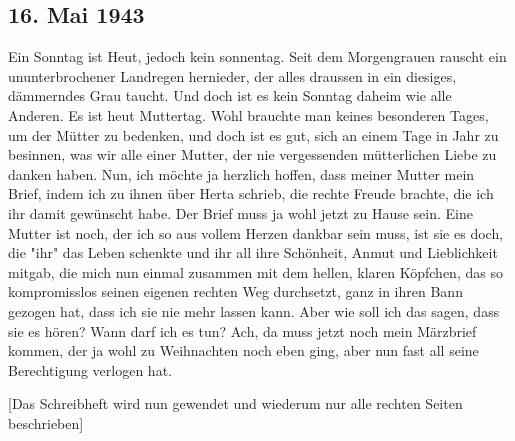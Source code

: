\subsection{16. Mai 1943}

Ein Sonntag ist Heut, jedoch kein sonnentag.
Seit dem Morgengrauen rauscht ein ununterbrochener Landregen hernieder, der alles draussen in ein diesiges, d\"{a}mmerndes Grau taucht.
Und doch ist es kein Sonntag daheim wie alle Anderen.
Es ist heut Muttertag.
Wohl brauchte man keines besonderen Tages, um der M\"{u}tter zu bedenken, und doch ist es gut, sich an einem Tage in Jahr zu besinnen, was wir alle einer Mutter, der nie vergessenden m\"{u}tterlichen Liebe zu danken haben.
Nun, ich m\"{o}chte ja herzlich hoffen, dass meiner Mutter mein Brief, indem ich zu ihnen \"{u}ber Herta schrieb, die rechte Freude brachte, die ich ihr damit gew\"{u}nscht habe.
Der Brief muss ja wohl jetzt zu Hause sein.
Eine Mutter ist noch, der ich so aus vollem Herzen dankbar sein muss, ist sie es doch, die "ihr" das Leben schenkte und ihr all ihre Sch\"{o}nheit, Anmut und Lieblichkeit mitgab, die mich nun einmal zusammen mit dem hellen, klaren K\"{o}pfchen, das so kompromisslos seinen eigenen rechten Weg durchsetzt, ganz in ihren Bann gezogen hat, dass ich sie nie mehr lassen kann.
Aber wie soll ich das sagen, dass sie es h\"{o}ren?
Wann darf ich es tun?
Ach, da muss jetzt noch mein M\"{a}rzbrief kommen, der ja wohl zu Weihnachten noch eben ging, aber nun fast all seine Berechtigung verlogen hat.

\vfill
{\color{red} [Das Schreibheft wird nun gewendet und wiederum nur alle rechten Seiten beschrieben] }

\clearpage
